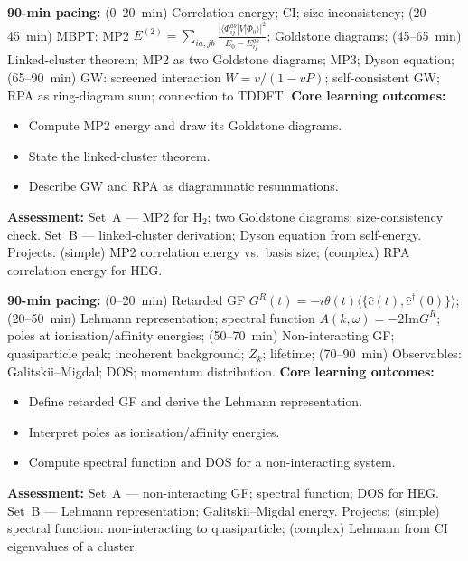 \documentclass[11pt,a4paper]{article}
\begin{document}
\medskip

\begin{tcolorbox}[modulebox, title={Module~II.4 --- Lecture L05: Beyond Mean Field --- MP2, Diagrams, and Resummations}]
\textbf{90-min pacing:} (0--20~min) Correlation energy; CI; size inconsistency; (20--45~min) MBPT: MP2 $E^{(2)}=\sum_{ia,jb}\tfrac{|\langle\Phi_{ij}^{ab}|\hat{V}|\Phi_0\rangle|^2}{E_0-E_{ij}^{ab}}$; Goldstone diagrams; (45--65~min) Linked-cluster theorem; MP2 as two Goldstone diagrams; MP3; Dyson equation; (65--90~min) GW: screened interaction $W=v/(1-vP)$; self-consistent GW; RPA as ring-diagram sum; connection to TDDFT.
\medskip\textbf{Core learning outcomes:}
\begin{itemize}[leftmargin=1.4em,topsep=2pt,itemsep=1pt]
  \item Compute MP2 energy and draw its Goldstone diagrams.
  \item State the linked-cluster theorem.
  \item Describe GW and RPA as diagrammatic resummations.
\end{itemize}
\medskip\textbf{Assessment:}
Set~A --- MP2 for H$_2$; two Goldstone diagrams; size-consistency check.
Set~B --- linked-cluster derivation; Dyson equation from self-energy.
Projects: (simple) MP2 correlation energy vs.\ basis size; (complex) RPA correlation energy for HEG.
\end{tcolorbox}

\medskip

\begin{tcolorbox}[modulebox, title={Module~II.4 --- Lecture L06: Green's Functions I}]
\textbf{90-min pacing:} (0--20~min) Retarded GF $G^R(t)=-i\theta(t)\langle\{\hat{c}(t),\hat{c}^\dagger(0)\}\rangle$; (20--50~min) Lehmann representation; spectral function $A(k,\omega)=-2\text{Im}G^R$; poles at ionisation/affinity energies; (50--70~min) Non-interacting GF; quasiparticle peak; incoherent background; $Z_k$; lifetime; (70--90~min) Observables: Galitskii--Migdal; DOS; momentum distribution.
\medskip\textbf{Core learning outcomes:}
\begin{itemize}[leftmargin=1.4em,topsep=2pt,itemsep=1pt]
  \item Define retarded GF and derive the Lehmann representation.
  \item Interpret poles as ionisation/affinity energies.
  \item Compute spectral function and DOS for a non-interacting system.
\end{itemize}
\medskip\textbf{Assessment:}
Set~A --- non-interacting GF; spectral function; DOS for HEG.
Set~B --- Lehmann representation; Galitskii--Migdal energy.
Projects: (simple) spectral function: non-interacting to quasiparticle; (complex) Lehmann from CI eigenvalues of a cluster.
\end{tcolorbox}
\end{document}
